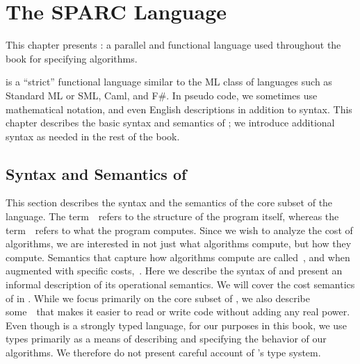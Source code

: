 \chapter{The SPARC Language}
\label{ch:sparc}

\begin{cluster}
\label{grp:prmbl:sparc::presents}

\begin{preamble}
\label{prmbl:sparc::presents}
This chapter presents \pml{}: a parallel and functional language used
throughout the book for specifying algorithms.

\pml is a ``strict'' functional language similar to the ML class of
languages such as Standard ML or SML, Caml, and F\#.
In pseudo code, we sometimes use mathematical notation, and even
English descriptions in addition to \pml{} syntax.
This chapter describes the basic syntax and semantics of \pml{}; we
introduce additional syntax as needed in the rest of the book.

\end{preamble}
\end{cluster}


\section{Syntax and Semantics of \pml{}}
\label{sec:sparc::syntax-and-semantics-of}

\begin{cluster}
\label{grp:grm:sparc::describes}

\begin{gram}
\label{grm:sparc::describes}
This section describes the syntax and the semantics of the core subset
of the \pml{} language.  The term~~refers to the
structure of the program itself, whereas the
term~~refers to what the program computes.
Since we wish to analyze the cost of algorithms, we are interested in
not just what algorithms compute, but how they compute.
Semantics that capture how algorithms compute are
called~, and when augmented with specific
costs,~.
Here we describe the syntax of \pml{} and present an informal
description of its operational semantics. 
We will cover the cost semantics of \pml in .
While we focus primarily on the core subset of \pml, we also describe
some~~that makes it easier to read or write code
without adding any real power.
Even though \pml is a strongly typed language, for our purposes in
this book, we use types primarily as a means of describing and
specifying the behavior of our algorithms.
We therefore do not present careful account of \pml's type system.

\end{gram}
\end{cluster}

